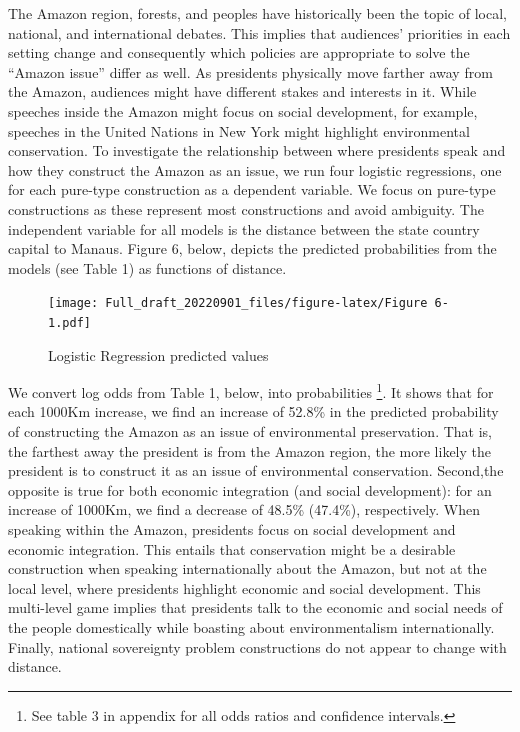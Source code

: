 \documentclass[
  12pt,
]{article}
\begin{document}
The Amazon region, forests, and peoples have historically been the topic
of local, national, and international debates. This implies that
audiences' priorities in each setting change and consequently which
policies are appropriate to solve the ``Amazon issue'' differ as well.
As presidents physically move farther away from the Amazon, audiences
might have different stakes and interests in it. While speeches inside
the Amazon might focus on social development, for example, speeches in
the United Nations in New York might highlight environmental
conservation. To investigate the relationship between where presidents
speak and how they construct the Amazon as an issue, we run four
logistic regressions, one for each pure-type construction as a dependent
variable. We focus on pure-type constructions as these represent most
constructions and avoid ambiguity. The independent variable for all
models is the distance between the state country capital to Manaus.
Figure 6, below, depicts the predicted probabilities from the models
(see Table 1) as functions of distance.

\begin{figure}
\centering
\texttt{[image: Full\_draft\_20220901\_files/figure-latex/Figure 6-1.pdf]}
\caption{Logistic Regression predicted values}
\end{figure}

We convert log odds from Table 1, below, into probabilities \footnote{See
  table 3 in appendix for all odds ratios and confidence intervals.}. It
shows that for each 1000Km increase, we find an increase of 52.8\% in
the predicted probability of constructing the Amazon as an issue of
environmental preservation. That is, the farthest away the president is
from the Amazon region, the more likely the president is to construct it
as an issue of environmental conservation. Second,the opposite is true
for both economic integration (and social development): for an increase
of 1000Km, we find a decrease of 48.5\% (47.4\%), respectively. When
speaking within the Amazon, presidents focus on social development and
economic integration. This entails that conservation might be a
desirable construction when speaking internationally about the Amazon,
but not at the local level, where presidents highlight economic and
social development. This multi-level game implies that presidents talk
to the economic and social needs of the people domestically while
boasting about environmentalism internationally. Finally, national
sovereignty problem constructions do not appear to change with distance.
\end{document}
